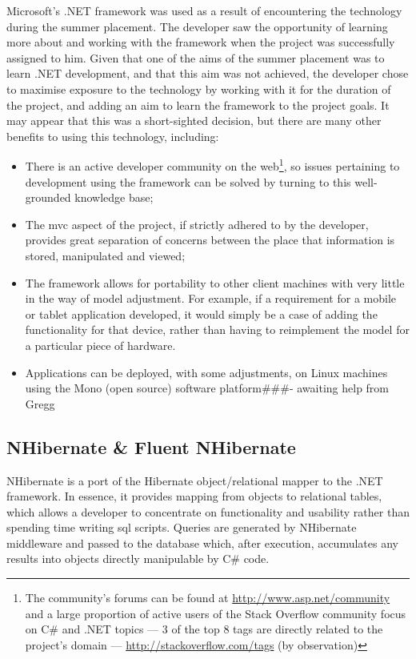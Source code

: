\documentclass{l4proj}
\newcommand{\revisit}{\#\#\#}
\begin{document}
Microsoft's .NET framework was used as a result of encountering the technology during the summer placement.  The developer saw the opportunity of learning more about and working with the framework when the project was successfully assigned to him.  Given that one of the aims of the summer placement was to learn .NET development, and that this aim was not achieved\cite{summerPlacementReport}, the developer chose to maximise exposure to the technology by working with it for the duration of the project, and adding an aim to learn the framework to the project goals.  It may appear that this was a short-sighted decision, but there are many other benefits to using this technology, including:
\begin{itemize}
	\item There is an active developer community on the web\footnote{The community's forums can be found at \url{http://www.asp.net/community} and a large proportion of active users of the Stack Overflow community focus on C\# and .NET topics --- 3 of the top 8 tags are directly related to the project's domain --- \url{http://stackoverflow.com/tags} (by observation)}, so issues pertaining to development using the framework can be solved by turning to this well-grounded knowledge base;
	\item The \gls{mvc} aspect of the project, if strictly adhered to by the developer, provides great separation of concerns between the place that information is stored, manipulated and viewed;
	\item The framework allows for portability to other client machines with very little in the way of model adjustment. For example, if a requirement for a mobile or tablet application developed, it would simply be a case of adding the functionality for that device, rather than having to reimplement the model for a particular piece of hardware.
	\item Applications can be deployed, with some adjustments, on Linux machines using the Mono (open source) software platform\revisit - awaiting help from Gregg
\end{itemize}

\subsection{NHibernate \& Fluent NHibernate}
NHibernate is a port of the Hibernate object/relational mapper to the .NET framework. In essence, it provides mapping from objects to relational tables, which allows a developer to concentrate on functionality and usability rather than spending time writing \gls{sql} scripts. Queries are generated by NHibernate middleware and passed to the database which, after execution, accumulates any results into objects directly manipulable by C\# code. 
\end{document}
